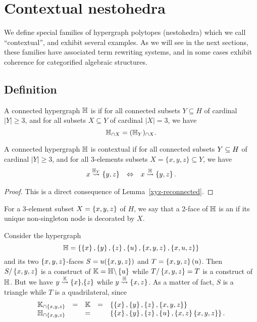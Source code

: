 
\section{Contextual nestohedra} 
\label{s:contextual}

We define special families of hypergraph polytopes (nestohedra) which we call ``contextual'', and exhibit several examples.
As we will see in the next sections, these families have associated term rewriting systems, and in some cases exhibit coherence for categorified algebraic structures.


\subsection{Definition}

\begin{definition}
  A connected hypergraph ${\mathbb H}$ is  if for all connected subsets $Y \subseteq H$ of cardinal $|Y|\geq 3$, and for all subsets $X \subseteq Y$ of cardinal $|X|=3$, we have
  $${\mathbb H}_{\cap X} = ({\mathbb H}_Y)_{\cap X}.$$ 
\end{definition}

\begin{lemma} \label{context-lemma}
A connected hypergraph ${\mathbb H}$ is contextual if for all connected subsets $Y\subseteq H$ of cardinal $|Y|\geq 3$, and for all $3$-elements subsets $X=\{x,y,z\} \subseteq Y$, we have 
$$\begin{array}{lll}
  x\stackrel{{{\mathbb H}_Y}}{\rightsquigarrow}\left\{y,z\right\} & \Leftrightarrow & x\stackrel{{\mathbb H}}{\rightsquigarrow}\left\{y,z\right\}.
  \end{array}$$
\end{lemma}
 
\begin{proof} 
  This is a direct consequence of Lemma~\ref{xyz-reconnected}.
\end{proof}

For a 3-element subset $X=\left\{x,y,z\right\}$ of $H$, we say that a 2-face of ${\mathbb H}$ is an  if its unique non-singleton node is decorated by $X$.

\begin{example} \label{non-contextual-1}
Consider the hypergraph 
$${\mathbb H}= \left\{\left\{x\right\},\left\{y\right\},\left\{z\right\},\left\{u\right\},\left\{x,y,z\right\}, \left\{x,u,z\right\}\right\}$$
and its two $\left\{x,y,z\right\}$-faces $S=u(\left\{x,y,z\right\})$ and $T=\left\{x,y,z\right\}(u)$. 
Then $S/\left\{x,y,z\right\}$ is a construct of
${\mathbb K}={\mathbb H}\backslash \left\{u\right\}$ while $T/\left\{x,y,z\right\}=T$ is a construct of ${\mathbb H}$.
But we have $y\stackrel{{\mathbb K}}{\rightsquigarrow}\left\{x\right\}\!,\!\left\{z\right\}$ while  $y\stackrel{{\mathbb H}}{\rightsquigarrow}\left\{x,z\right\}$. 
As a matter of fact,
$S$ is a triangle while $T$ is a quadrilateral, since
$$\begin{array}{lllll}
{\mathbb K}_{\cap \left\{x,y,z\right\}} &=& {\mathbb K} & = & \left\{\left\{x\right\},\left\{y\right\},\left\{z\right\},\left\{x,y,z\right\}\right\}\\
{\mathbb H}_{\cap \left\{x,y,z\right\}} && =&&  \left\{\left\{x\right\},\left\{y\right\},\left\{z\right\},\left\{u\right\},\left\{x,z\right\}\left\{x,y,z\right\}\right\}.
\end{array}$$
\end{example}
  
